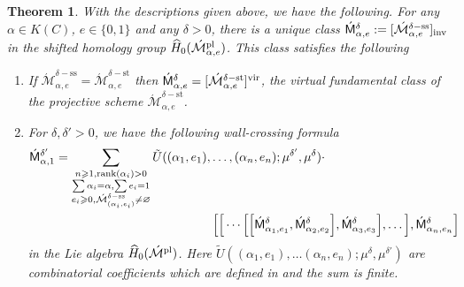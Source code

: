\documentclass[11pt]{amsart}
\newtheorem{theorem}{Theorem}
\theoremstyle{remark}
\newcommand{\Mdash}{\acute{\mathcal{M}}}
\newcommand{\rk}{\textnormal{rank}}
\newcommand{\wh}[1]{\widehat{#1}}
\newcommand{\vir}[0]{\textnormal{vir}}
\newcommand{\inv}[0]{\textnormal{inv}}
\newcommand{\pl}[0]{\textnormal{pl}}
\newcommand{\sfMdash}{\acute{\mathsf M}}
\renewcommand{\ss}[0]{\text{ss}}
\newcommand{\st}[0]{\text{st}}
\numberwithin{theorem}{section}
\begin{document}
    \begin{theorem}\label{theorem wallcrossing formula}
        With the descriptions given above, we have the following.
        For any $\alpha\in K(C)$, $e\in \{0,1\}$ and any $\delta>0$,
        there is a unique class 
        $\sfMdash^\delta_{\alpha,e}:=[\Mdash_{\alpha,e}^{\delta-\ss}]_\inv$ in the  shifted homology group
        $\wh H_0(\Mdash_{\alpha,e}^{\pl})$.
        This class satisfies the following
        \begin{enumerate}
            \item If $\Mdash_{\alpha,e}^{\delta-\ss} = \Mdash_{\alpha,e}^{\delta-\st}$
            then $\sfMdash^\delta_{\alpha,e} = [\Mdash_{\alpha,e}^{\delta-\st}]^\vir$,
            the virtual fundamental class of the projective scheme $\Mdash_{\alpha,e}^{\delta-\st}$.
        
            \item For $\delta, \delta'>0$, we have the following wall-crossing formula
            \begin{align}\label{equation wall-crossing theorem}
            \nonumber
                \sfMdash^{\delta'}_{\alpha,1} = \sum_{\substack{n \geqslant 1, \rk(\alpha_i)>0\\ 
                \sum \alpha_i = \alpha, \sum e_i=1 \\
                 e_i \geqslant 0, \Mdash^{\delta-\ss}_{(\alpha_i,e_i)} \neq \varnothing
                }} \tilde U((\alpha_1,e_1),& \dots,(\alpha_n,e_n); \mu^{\delta'},\mu^{\delta}) \cdot \\
                & \left[ \Big[ \cdots \Big[ \Big[\sfMdash^\delta_{\alpha_1,e_1}, \sfMdash^\delta_{\alpha_2,e_2} \Big], 
                \sfMdash^\delta_{\alpha_3,e_3} \Big],
                \dots \Big],\sfMdash^\delta_{\alpha_n,e_n}\right]
            \end{align}
            in the Lie algebra $\wh H_{0}(\Mdash^{\pl})$.
            Here $\tilde U((\alpha_1,e_1),\dots (\alpha_n,e_n);\mu^\delta,\mu^{\delta'})$ 
            are combinatorial coefficients which are defined 
            in \cite[Theorem 3.12]{Joy21} and the sum is finite.
        \end{enumerate}
    \end{theorem}
\end{document}
